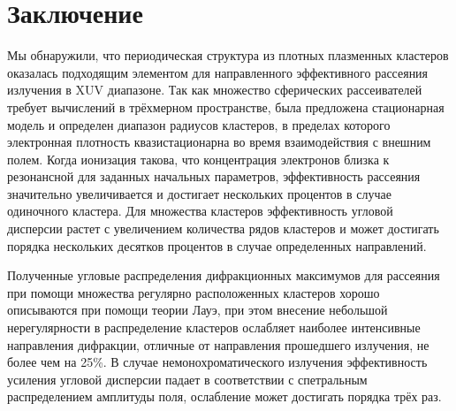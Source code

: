 \section{Заключение}

Мы обнаружили, что периодическая структура из плотных плазменных кластеров оказалась подходящим элементом для направленного эффективного рассеяния излучения в XUV диапазоне. Так как множество сферических рассеивателей требует вычислений в трёхмерном пространстве, была предложена стационарная модель и определен диапазон радиусов кластеров, в пределах которого электронная плотность квазистационарна во время взаимодействия с внешним полем. Когда ионизация такова, что концентрация электронов близка к резонансной для заданных начальных параметров, эффективность рассеяния значительно увеличивается и достигает нескольких процентов в случае одиночного кластера. Для множества кластеров эффективность угловой дисперсии растет с увеличением количества рядов кластеров и может достигать порядка нескольких десятков процентов в случае определенных направлений.

Полученные угловые распределения дифракционных максимумов для рассеяния при помощи множества регулярно расположенных кластеров хорошо описываются при помощи теории Лауэ, при этом внесение небольшой нерегулярности в распределение кластеров ослабляет наиболее интенсивные направления дифракции, отличные от направления прошедшего излучения, не более чем на 25\%. В случае немонохроматического излучения эффективность усиления угловой дисперсии падает в соответствии с спетральным распределением амплитуды поля, ослабление может достигать порядка трёх раз.